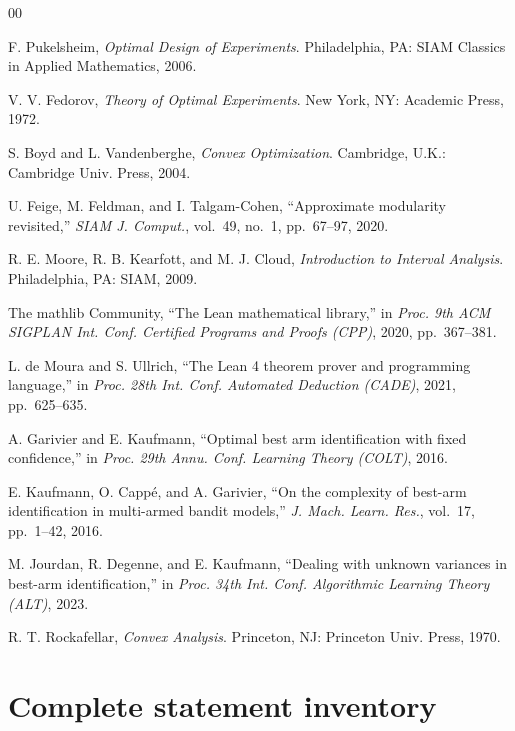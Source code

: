 \begin{thebibliography}{00}

 F. Pukelsheim, \emph{Optimal Design of Experiments}. Philadelphia,
PA: SIAM Classics in Applied Mathematics, 2006.

 V. V. Fedorov, \emph{Theory of Optimal Experiments}. New York, NY:
Academic Press, 1972.

 S. Boyd and L. Vandenberghe, \emph{Convex Optimization}. Cambridge,
U.K.: Cambridge Univ. Press, 2004.

 U. Feige, M. Feldman, and I. Talgam-Cohen, ``Approximate modularity
revisited,'' \emph{SIAM J. Comput.}, vol.~49, no.~1, pp.~67--97, 2020.

 R. E. Moore, R. B. Kearfott, and M. J. Cloud, \emph{Introduction to
Interval Analysis}. Philadelphia, PA: SIAM, 2009.

 The mathlib Community, ``The Lean mathematical library,'' in
\emph{Proc. 9th ACM SIGPLAN Int. Conf. Certified Programs and Proofs (CPP)}, 2020,
pp.~367--381.

 L. de Moura and S. Ullrich, ``The Lean 4 theorem prover and
programming language,'' in \emph{Proc. 28th Int. Conf. Automated Deduction (CADE)}, 2021,
pp.~625--635.

 A. Garivier and E. Kaufmann, ``Optimal best arm identification with
fixed confidence,'' in \emph{Proc. 29th Annu. Conf. Learning Theory (COLT)}, 2016.

 E. Kaufmann, O. Capp\'e, and A. Garivier, ``On the complexity of
best-arm identification in multi-armed bandit models,'' \emph{J. Mach. Learn. Res.},
vol.~17, pp.~1--42, 2016.

 M. Jourdan, R. Degenne, and E. Kaufmann, ``Dealing with unknown
variances in best-arm identification,'' in \emph{Proc. 34th Int. Conf. Algorithmic Learning
Theory (ALT)}, 2023.

 R. T. Rockafellar, \emph{Convex Analysis}. Princeton, NJ:
Princeton Univ. Press, 1970.

\end{thebibliography}

\appendices
\section{Complete statement inventory}
\label{app:d6-inventory}

